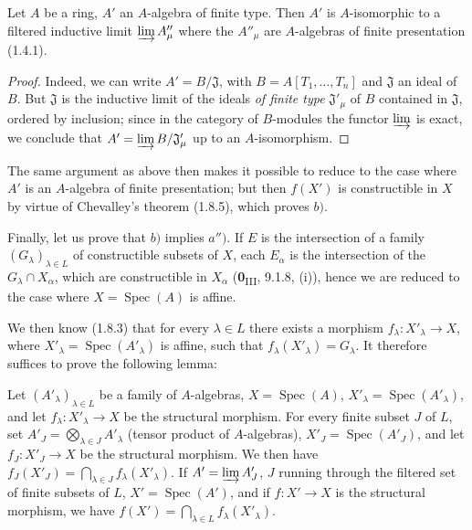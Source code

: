 \begin{lemma}[1.9.3.1]
\label{IV.1.9.3.1}
Let $A$ be a ring, $A'$ an $A$-algebra of finite type. Then $A'$ is
$A$-isomorphic to a filtered inductive limit $\varinjlim A''_\mu$ where the
$A''_\mu$ are $A$-algebras of finite presentation \textup{(1.4.1)}.
\end{lemma}

\begin{proof}
Indeed, we can write $A'=B/\mathfrak J$, with
$B=A[T_1,\ldots,T_n]$ and $\mathfrak J$ an ideal of $B$. But $\mathfrak J$
is the inductive limit of the ideals \emph{of finite type} $\mathfrak J'_\mu$
of $B$ contained in $\mathfrak J$, ordered by inclusion; since in the
category of $B$-modules the functor $\varinjlim$ is exact, we conclude
that $A'=\varinjlim B/\mathfrak J'_\mu$ up to an $A$-isomorphism.
\end{proof}

The same argument as above then makes it possible to reduce to the case where
$A'$ is an $A$-algebra of finite presentation; but then $f(X')$ is
constructible in $X$ by virtue of Chevalley's theorem (1.8.5), which
proves $b)$.

Finally, let us prove that $b)$ implies $a'')$. If $E$ is the intersection of
a family $(G_\lambda)_{\lambda\in L}$ of constructible subsets of $X$,
each $E_\alpha$ is the intersection of the $G_\lambda\cap X_\alpha$, which are
constructible in $X_\alpha$ (\textbf{0}\textsubscript{III}, 9.1.8, (i)), hence we
are reduced to the case where $X=\operatorname{Spec}(A)$ is affine.

We then know (1.8.3) that for every $\lambda\in L$ there exists a morphism
$f_\lambda:X'_\lambda\to X$, where
$X'_\lambda=\operatorname{Spec}(A'_\lambda)$ is affine, such that
$f_\lambda(X'_\lambda)=G_\lambda$. It therefore suffices to prove the
following lemma:

\begin{lemma}[1.9.3.2]
\label{IV.1.9.3.2}
Let $(A'_\lambda)_{\lambda\in L}$ be a family of $A$-algebras,
$X=\operatorname{Spec}(A)$, $X'_\lambda=\operatorname{Spec}(A'_\lambda)$,
and let $f_\lambda:X'_\lambda\to X$ be the structural morphism. For every
finite subset $J$ of $L$, set
$A'_J=\bigotimes_{\lambda\in J}A'_\lambda$ (tensor product of
$A$-algebras), $X'_J=\operatorname{Spec}(A'_J)$, and let $f_J:X'_J\to X$ be
the structural morphism. We then have
$f_J(X'_J)=\bigcap_{\lambda\in J}f_\lambda(X'_\lambda)$. If
$A'=\varinjlim A'_J$, $J$ running through the filtered set of finite subsets
of $L$, $X'=\operatorname{Spec}(A')$, and if $f:X'\to X$ is the
structural morphism, we have
$f(X')=\bigcap_{\lambda\in L}f_\lambda(X'_\lambda)$.
\end{lemma}

